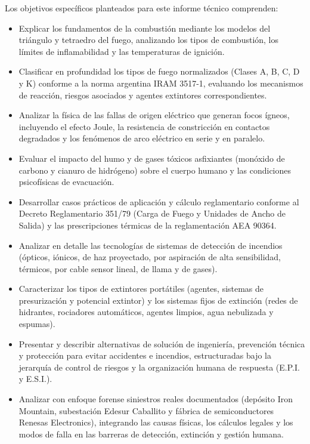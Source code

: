 Los objetivos específicos planteados para este informe técnico comprenden:
\begin{itemize}
    \item Explicar los fundamentos de la combustión mediante los modelos del triángulo y tetraedro del fuego,
          analizando los tipos de combustión, los límites de inflamabilidad y las temperaturas de ignición.
    \item Clasificar en profundidad los tipos de fuego normalizados (Clases A, B, C, D y K) conforme a la norma argentina
          IRAM 3517-1, evaluando los mecanismos de reacción, riesgos asociados y agentes extintores correspondientes.
    \item Analizar la física de las fallas de origen eléctrico que generan focos ígneos, incluyendo el efecto Joule, la
          resistencia de constricción en contactos degradados y los fenómenos de arco eléctrico en serie y en paralelo.
    \item Evaluar el impacto del humo y de gases tóxicos asfixiantes (monóxido de carbono y cianuro de hidrógeno) sobre
          el cuerpo humano y las condiciones psicofísicas de evacuación.
    \item Desarrollar casos prácticos de aplicación y cálculo reglamentario conforme al Decreto Reglamentario 351/79 (Carga
          de Fuego y Unidades de Ancho de Salida) y las prescripciones térmicas de la reglamentación AEA 90364.
    \item Analizar en detalle las tecnologías de sistemas de detección de incendios (ópticos, iónicos, de haz
          proyectado, por aspiración de alta sensibilidad, térmicos, por cable sensor lineal, de llama y de gases).
    \item Caracterizar los tipos de extintores portátiles (agentes, sistemas de presurización y potencial extintor) y los
          sistemas fijos de extinción (redes de hidrantes, rociadores automáticos, agentes limpios, agua nebulizada y
          espumas).
    \item Presentar y describir alternativas de solución de ingeniería, prevención técnica y protección para evitar
          accidentes e incendios, estructuradas bajo la jerarquía de control de riesgos y la organización humana de
          respuesta (E.P.I. y E.S.I.).
    \item Analizar con enfoque forense siniestros reales documentados (depósito Iron Mountain, subestación Edesur
          Caballito y fábrica de semiconductores Renesas Electronics), integrando las causas físicas, los cálculos
          legales y los modos de falla en las barreras de detección, extinción y gestión humana.

\end{itemize}
